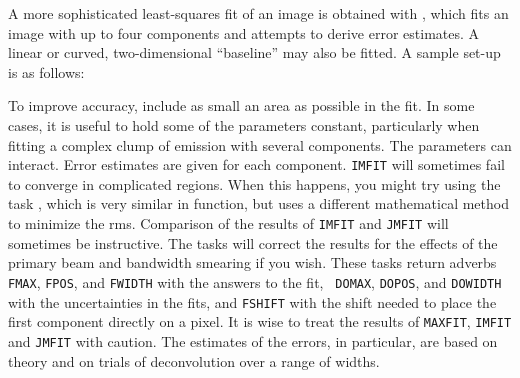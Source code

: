      A more sophisticated least-squares fit of an image is obtained
with {\tt {}}, which fits an image with up to four
 components and attempts to derive error estimates.  A
linear or curved, two-dimensional ``baseline'' may also be fitted.  A
sample set-up is as follows:
\pd
{}

     To improve accuracy, include as small an area as possible in the
fit. In some cases, it is useful to hold some of the parameters
constant, particularly when fitting a complex clump of emission with
several components.  The parameters can interact.  Error estimates are
given for each component.  {\tt IMFIT} will sometimes fail to converge
in complicated regions.  When this happens, you might try using the
task {\tt {}}, which is very similar in function, but uses a
different mathematical method to minimize the rms.  Comparison of the
results of {\tt IMFIT} and {\tt JMFIT} will sometimes be instructive.
The tasks will correct the results for the effects of the primary beam
and bandwidth smearing if you wish.  These tasks return adverbs {\tt
FMAX}, {\tt FPOS}, and {\tt FWIDTH} with the answers to the fit, {\tt
DOMAX}, {\tt DOPOS}, and {\tt DOWIDTH} with the uncertainties in the
fits, and {\tt FSHIFT} with the shift needed to place the first
component  directly on a pixel.  It is wise to treat the results of
{\tt MAXFIT}, {\tt IMFIT} and {\tt JMFIT} with caution.  The estimates
of the errors, in particular, are based on theory and on trials of
deconvolution over a range of widths.

